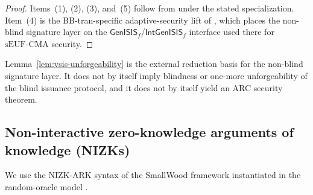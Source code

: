 \begin{proof}
Items~(1), (2), (3), and~(5) follow from
\cite[Theorems~4, 5, 7, 8, and Corollary~1]{EPRINT:DKLW25} under the stated specialization. Item~(4) is the
BB-tran-specific adaptive-security lift of \cite[Section~5.2 and Theorem~6]{EPRINT:DKLW25}, which places the
non-blind signature layer on the \(\mathsf{GenISIS}_f\)/\(\mathsf{IntGenISIS}_f\) interface used there for
\(\mathrm{sEUF\mbox{-}CMA}\) security.
\end{proof}

\begin{remark}\label{rem:vsis-unforgeability}
Lemma~\ref{lem:vsis-unforgeability} is the external reduction basis for the non-blind signature layer. It
does not by itself imply blindness or one-more unforgeability of the blind issuance protocol, and it does not by
itself yield an ARC security theorem.
\end{remark}

\subsection{Non-interactive zero-knowledge arguments of knowledge (NIZKs)}
\label{subsec:prelim-nizk}
\label{subsec:nizk-ark}
We use the NIZK-ARK syntax of the SmallWood framework instantiated in the random-oracle model
\cite[Definition~3]{EPRINT:FenRiv25b}.

